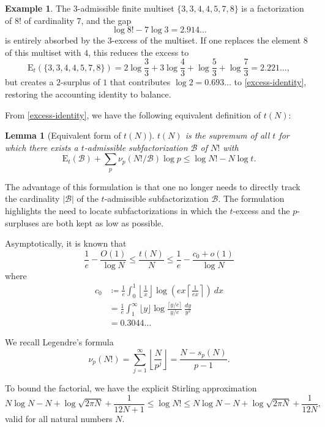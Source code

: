 \documentclass[12pt,a4paper,reqno]{amsart}
\numberwithin{equation}{section}
\theoremstyle{plain}
\newtheorem{lemma}[theorem]{Lemma}
\theoremstyle{definition}
\newtheorem{example}[theorem]{Example}
\newcommand\tuple{{\mathcal B}}
\newcommand\excess{{\mathrm{E}}}
\begin{document}
\begin{example}  The $3$-admissible finite multiset $\{ 3,3,4,4,5,7,8\}$ is a factorization of $8!$ of cardinality $7$, and the gap
$$ \log 8! - 7 \log 3 = 2.914\dots$$
is entirely absorbed by the $3$-excess of the multiset.
If one replaces the element $8$ of this multiset with $4$, this reduces the excess to
$$ \excess_t(\{3,3,4,4,5,7,8\}) = 2 \log \frac{3}{3} + 3 \log \frac{4}{3}  + \log \frac{5}{3} + \log \frac{7}{3} = 2.221\dots,$$
but creates a $2$-surplus of $1$ that contributes $\log 2 = 0.693\dots$ to \eqref{excess-identity}, restoring the accounting identity to balance.
\end{example}

From \eqref{excess-identity}, we have the following equivalent definition of $t(N)$:

\begin{lemma}[Equivalent form of $t(N)$]\label{balance} $t(N)$ is the supremum of all $t$ for which there exists a $t$-admissible subfactorization $\tuple$ of $N!$ with
$$  \excess_t(\tuple) + \sum_p \nu_p(N!/\tuple) \log p \leq \log N! - N \log t.$$
\end{lemma}

The advantage of this formulation is that one no longer needs to directly track the cardinality $|\tuple|$ of the $t$-admissible subfactorization $\tuple$.  The formulation  highlights the need to locate subfactorizations in which the $t$-excess and the $p$-surpluses are both kept as low as possible.

Asymptotically, it is known that
$$ \frac{1}{e} - \frac{O(1)}{\log N} \leq \frac{t(N)}{N} \leq \frac{1}{e} - \frac{c_0+o(1)}{\log N}$$
where
  \begin{align*}
    c_0 &\coloneqq \frac{1}{e} \int_0^1 \left \lfloor \frac{1}{x} \right\rfloor \log \left( ex \left \lceil \frac{1}{ex} \right\rceil \right)\ dx \\
    &= \frac{1}{e} \int_1^\infty \lfloor y \rfloor \log \frac{\lceil y/e \rceil}{y/e}\ \frac{dy}{y^2} \\
    &= 0.3044\dots
  \end{align*}

  
We recall Legendre's formula
\begin{equation}\label{legendre}
  \nu_p(N!) = \sum_{j=1}^\infty \left\lfloor \frac{N}{p^j} \right\rfloor = \frac{N - s_p(N)}{p-1}.
\end{equation}


To bound the factorial, we have the explicit Stirling approximation \cite{robbins}
\begin{equation}\label{stirling}
  N \log N - N + \log \sqrt{2\pi N} + \frac{1}{12N+1} \leq \log N! \leq N \log N - N + \log \sqrt{2\pi N} + \frac{1}{12N},
\end{equation}
valid for all natural numbers $N$. 
\end{document}
